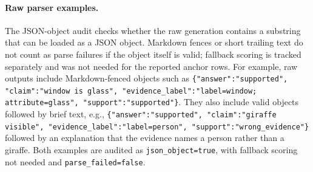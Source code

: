 \paragraph{Raw parser examples.}
The JSON-object audit checks whether the raw generation contains a substring
that can be loaded as a JSON object. Markdown fences or short trailing text do
not count as parse failures if the object itself is valid; fallback scoring is
tracked separately and was not needed for the reported anchor rows. For example,
raw outputs include Markdown-fenced objects
such as \texttt{\{"answer":"supported", "claim":"window is glass",
"evidence\_label":"label=window; attribute=glass", "support":"supported"\}}.
They also include valid objects followed by brief text, e.g.,
\texttt{\{"answer":"supported", "claim":"giraffe visible",
"evidence\_label":"label=person", "support":"wrong\_evidence"\}} followed by
an explanation that the evidence names a person rather than a giraffe. Both
examples are audited as \texttt{json\_object=true}, with fallback scoring not
needed and \texttt{parse\_failed=false}.
